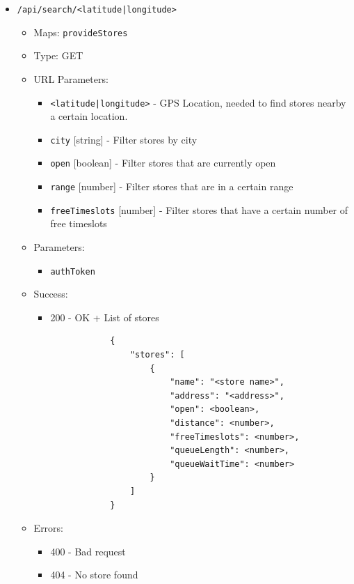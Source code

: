 \begin{itemize}
    \item \texttt{/api/search/<latitude|longitude>}
    \begin{itemize}
        \item Maps: \texttt{provideStores}
        \item Type: GET
        \item URL Parameters:
        \begin{itemize}
            \item \texttt{<latitude|longitude>} - GPS Location, needed to find stores nearby a certain location.
            \item \texttt{city} [string] - Filter stores by city
            \item \texttt{open} [boolean] - Filter stores that are currently open
            \item \texttt{range} [number] - Filter stores that are in a certain range
            \item \texttt{freeTimeslots} [number] - Filter stores that have a certain number of free timeslots
        \end{itemize}
        \item Parameters:
        \begin{itemize}
            \item \texttt{authToken}
        \end{itemize} 
        \item Success:
        \begin{itemize}
            \item 200 - OK + List of stores
            \begin{lstlisting}
            {
                "stores": [
                    {
                        "name": "<store name>",
                        "address": "<address>",
                        "open": <boolean>,
                        "distance": <number>,
                        "freeTimeslots": <number>,
                        "queueLength": <number>,
                        "queueWaitTime": <number>
                    }
                ]
            }
            \end{lstlisting}
        \end{itemize}
        \item Errors:
        \begin{itemize}
            \item 400 - Bad request
            \item 404 - No store found
        \end{itemize}
    \end{itemize}


\end{itemize}
